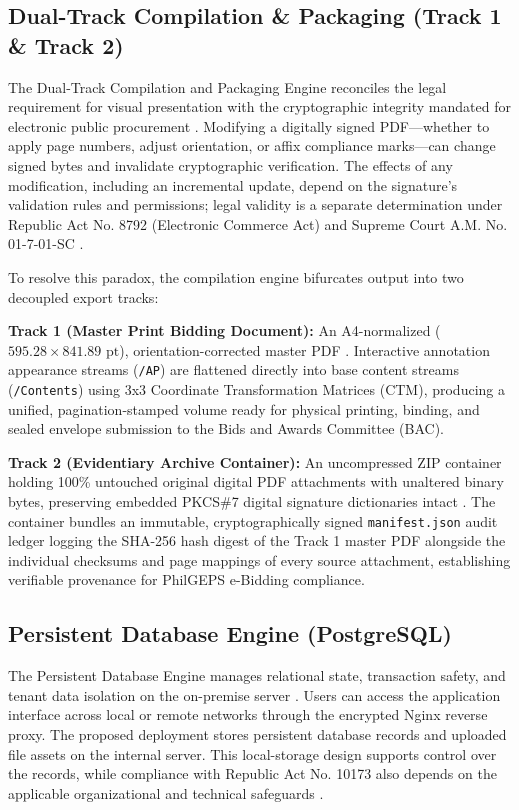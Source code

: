 \subsection{Dual-Track Compilation \& Packaging (Track 1 \& Track 2)}
The Dual-Track Compilation and Packaging Engine reconciles the legal requirement for visual presentation with the cryptographic integrity mandated for electronic public procurement \cite{ref42}.
Modifying a digitally signed PDF---whether to apply page numbers, adjust orientation, or affix compliance marks---can change signed bytes and invalidate cryptographic verification. The effects of any modification, including an incremental update, depend on the signature's validation rules and permissions; legal validity is a separate determination under Republic Act No. 8792 (Electronic Commerce Act) \cite{ref10} and Supreme Court A.M. No. 01-7-01-SC \cite{ref11}.

To resolve this paradox, the compilation engine bifurcates output into two decoupled export tracks:

\textbf{Track 1 (Master Print Bidding Document):} An A4-normalized ($595.28 \times 841.89\text{ pt}$), orientation-corrected master PDF \cite{ref12}.
Interactive annotation appearance streams (\texttt{/AP}) are flattened directly into base content streams (\texttt{/Contents}) using 3x3 Coordinate Transformation Matrices (CTM), producing a unified, pagination-stamped volume ready for physical printing, binding, and sealed envelope submission to the Bids and Awards Committee (BAC).

\textbf{Track 2 (Evidentiary Archive Container):} An uncompressed ZIP container holding 100\% untouched original digital PDF attachments with unaltered binary bytes, preserving embedded PKCS\#7 digital signature dictionaries intact \cite{ref41}.
The container bundles an immutable, cryptographically signed \texttt{manifest.json} audit ledger \cite{ref43, ref44} logging the SHA-256 hash digest of the Track 1 master PDF alongside the individual checksums and page mappings of every source attachment, establishing verifiable provenance for PhilGEPS e-Bidding compliance.

\subsection{Persistent Database Engine (PostgreSQL)}
The Persistent Database Engine manages relational state, transaction safety, and tenant data isolation on the on-premise server \cite{ref55}.
Users can access the application interface across local or remote networks through the encrypted Nginx reverse proxy. The proposed deployment stores persistent database records and uploaded file assets on the internal server. This local-storage design supports control over the records, while compliance with Republic Act No. 10173 also depends on the applicable organizational and technical safeguards \cite{ref6}.

